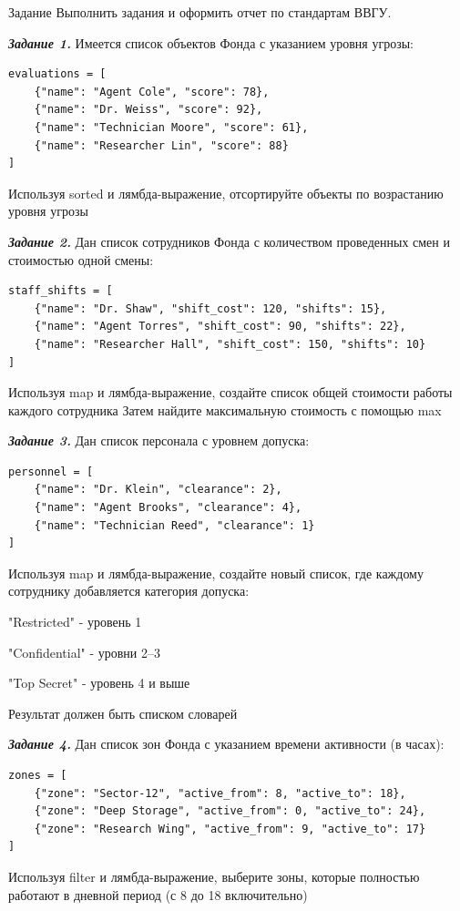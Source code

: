 \documentclass{vvsu}
\begin{document}
\begin{addition}{Задание}
  Выполнить задания и оформить отчет по стандартам ВВГУ.

  \textit{\textbf{Задание 1.}}
  Имеется список объектов Фонда с указанием уровня угрозы:

 \begin{lstlisting}[basicstyle=\ttfamily\small]
evaluations = [
    {"name": "Agent Cole", "score": 78},
    {"name": "Dr. Weiss", "score": 92},
    {"name": "Technician Moore", "score": 61},
    {"name": "Researcher Lin", "score": 88}
]
\end{lstlisting}
  Используя sorted и лямбда-выражение, отсортируйте объекты по возрастанию уровня угрозы


  \textit{\textbf{Задание 2.}}  
  Дан список сотрудников Фонда с количеством проведенных смен и стоимостью одной смены:
\begin{lstlisting}[basicstyle=\ttfamily\small]
staff_shifts = [
    {"name": "Dr. Shaw", "shift_cost": 120, "shifts": 15},
    {"name": "Agent Torres", "shift_cost": 90, "shifts": 22},
    {"name": "Researcher Hall", "shift_cost": 150, "shifts": 10}
]
\end{lstlisting}
  Используя map и лямбда-выражение, создайте список общей стоимости работы каждого сотрудника
  Затем найдите максимальную стоимость с помощью max

  \textit{\textbf{Задание 3.}}  
  Дан список персонала с уровнем допуска:
\begin{lstlisting}[basicstyle=\ttfamily\small]
personnel = [
    {"name": "Dr. Klein", "clearance": 2},
    {"name": "Agent Brooks", "clearance": 4},
    {"name": "Technician Reed", "clearance": 1}
]
\end{lstlisting}
  Используя map и лямбда-выражение, создайте новый список, где каждому сотруднику добавляется категория допуска:
\begin{vvsu_itemize}
    \item "Restricted" - уровень 1
    \item "Confidential" - уровни 2–3
    \item "Top Secret" - уровень 4 и выше
\end{vvsu_itemize}
Результат должен быть списком словарей

  \textit{\textbf{Задание 4.}}  
  Дан список зон Фонда с указанием времени активности (в часах):
\begin{lstlisting}[basicstyle=\ttfamily\small]
zones = [
    {"zone": "Sector-12", "active_from": 8, "active_to": 18},
    {"zone": "Deep Storage", "active_from": 0, "active_to": 24},
    {"zone": "Research Wing", "active_from": 9, "active_to": 17}
]
\end{lstlisting}
  Используя filter и лямбда-выражение, выберите зоны, которые полностью работают в дневной период (с 8 до 18 включительно)


\end{addition}
\end{document}
